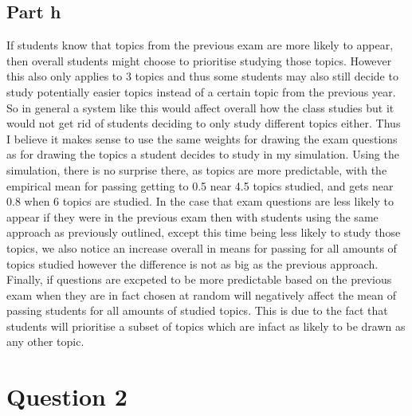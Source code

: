 \documentclass[10pt]{article}
\begin{document}
\subsection*{Part h}
If students know that topics from the previous exam are more likely to appear, then overall students
might choose to prioritise studying those topics. However this also only applies to 3 topics and thus
some students may also still decide to study potentially easier topics instead of a certain topic 
from the previous year. So in general a system like this would affect overall how the class studies but
it would not get rid of students deciding to only study different topics either. Thus I believe it makes sense to 
use the same weights for drawing the exam questions as for drawing the topics a student decides to study in 
my simulation. Using the simulation, there is no surprise there, as topics are more predictable, with the 
empirical mean for passing getting to 0.5 near 4.5 topics studied, and gets near 0.8 when 6 topics are studied.
In the case that exam questions are less likely to appear if they were in the previous exam then with students using
the same approach as previously outlined, except this time being less likely to study those topics, we also notice
an increase overall in means for passing for all amounts of topics studied however the difference is not as big as the previous
approach.
Finally, if questions are excpeted to be more predictable based on the previous exam when they are in fact 
chosen at random will negatively affect the mean of passing students for all amounts of studied topics. This is 
due to the fact that students will prioritise a subset of topics which are infact as likely to be drawn as 
any other topic.


\section*{Question 2}
\end{document}
